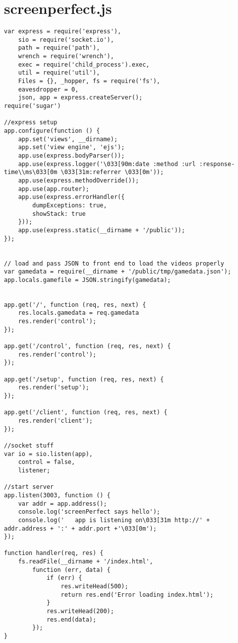 \section{screenperfect.js}
\begin{lstlisting}
var express = require('express'),
    sio = require('socket.io'),
    path = require('path'),
    wrench = require('wrench'),
    exec = require('child_process').exec,
    util = require('util'),
    Files = {}, _hopper, fs = require('fs'),
    eavesdropper = 0,
    json, app = express.createServer();
require('sugar')

//express setup
app.configure(function () {
    app.set('views', __dirname);
    app.set('view engine', 'ejs');
    app.use(express.bodyParser());
    app.use(express.logger('\033[90m:date :method :url :response-time\\ms\033[0m \033[31m:referrer \033[0m'));
    app.use(express.methodOverride());
    app.use(app.router);
    app.use(express.errorHandler({
        dumpExceptions: true,
        showStack: true
    }));
    app.use(express.static(__dirname + '/public'));
});


// load and pass JSON to front end to load the videos properly
var gamedata = require(__dirname + '/public/tmp/gamedata.json');
app.locals.gamefile = JSON.stringify(gamedata);


app.get('/', function (req, res, next) {
    res.locals.gamedata = req.gamedata
    res.render('control');
});

app.get('/control', function (req, res, next) {
    res.render('control');
});

app.get('/setup', function (req, res, next) {
    res.render('setup');
});

app.get('/client', function (req, res, next) {
    res.render('client');
});

//socket stuff
var io = sio.listen(app),
    control = false,
    listener; 

//start server
app.listen(3003, function () {
    var addr = app.address();
    console.log('screenPerfect says hello');
    console.log('   app is listening on\033[31m http://' + addr.address + ':' + addr.port +'\033[0m');
});

function handler(req, res) {
    fs.readFile(__dirname + '/index.html',
        function (err, data) {
            if (err) {
                res.writeHead(500);
                return res.end('Error loading index.html');
            }
            res.writeHead(200);
            res.end(data);
        });
}


\end{lstlisting}

